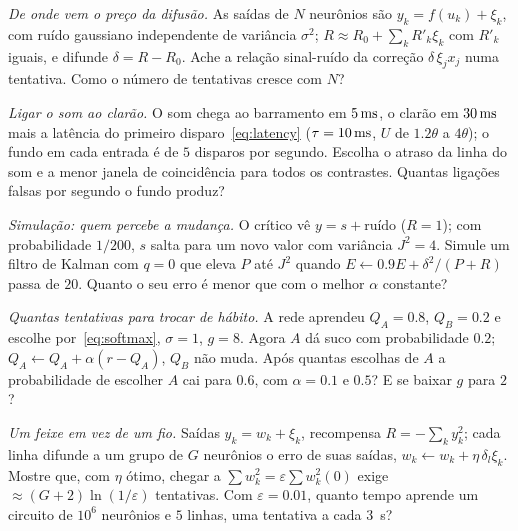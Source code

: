 \begin{exercise}[\lvlB]
\label{ex:10:3}
\emph{De onde vem o preço da difusão.} As saídas de $N$ neurônios são $y_k=f(u_k)+\xi_k$, com ruído gaussiano independente de variância $\sigma^2$; $R\approx R_0+\sum_kR'_k\xi_k$ com $R'_k$ iguais, e  difunde $\delta=R-R_0$. Ache a relação sinal-ruído da correção $\delta\,\xi_jx_j$ numa tentativa. Como o número de tentativas cresce com $N$?
\end{exercise}

\begin{exercise}[\lvlB]
\label{ex:10:4}
\emph{Ligar o som ao clarão.} O som chega ao barramento em $5\,\text{ms}$, o clarão em $30\,\text{ms}$ mais a latência do primeiro disparo~\eqref{eq:latency} ($\tau=10\,\text{ms}$, $U$ de $1.2\theta$ a $4\theta$); o fundo em cada entrada é de $5$ disparos por segundo. Escolha o atraso da linha do som e a menor janela de coincidência para todos os contrastes. Quantas ligações falsas por segundo o fundo produz?
\end{exercise}

\begin{exercise}[\lvlB]
\label{ex:10:5}
\emph{Simulação: quem percebe a mudança.} O crítico vê $y=s+\text{ruído}$ ($R=1$); com probabilidade $1/200$, $s$ salta para um novo valor com variância $J^2=4$. Simule um filtro de Kalman com $q=0$ que eleva $P$ até $J^2$ quando $E\leftarrow0.9E+\delta^2/(P+R)$ passa de $20$. Quanto o seu erro é menor que com o melhor $\alpha$ constante?
\end{exercise}

\begin{exercise}[\lvlA]
\label{ex:10:6}
\emph{Quantas tentativas para trocar de hábito.} A rede aprendeu $Q_A=0.8$, $Q_B=0.2$ e escolhe por~\eqref{eq:softmax}, $\sigma=1$, $g=8$. Agora $A$ dá suco com probabilidade $0.2$; $Q_A\leftarrow Q_A+\alpha(r-Q_A)$, $Q_B$ não muda. Após quantas escolhas de $A$ a probabilidade de escolher $A$ cai para $0.6$, com $\alpha=0.1$ e $0.5$? E se  baixar $g$ para $2$?
\end{exercise}

\begin{exercise}[\lvlC]
\label{ex:10:7}
\emph{Um feixe em vez de um fio.} Saídas $y_k=w_k+\xi_k$, recompensa $R=-\sum_ky_k^2$; cada linha difunde a um grupo de $G$ neurônios o erro de suas saídas, $w_k\leftarrow w_k+\eta\,\delta_l\xi_k$. Mostre que, com $\eta$ ótimo, chegar a $\sum w_k^2=\varepsilon\sum w_k^2(0)$ exige $\approx(G+2)\ln(1/\varepsilon)$ tentativas. Com $\varepsilon=0.01$, quanto tempo aprende um circuito de $10^6$ neurônios e $5$ linhas, uma tentativa a cada $3$~s?
\end{exercise}
